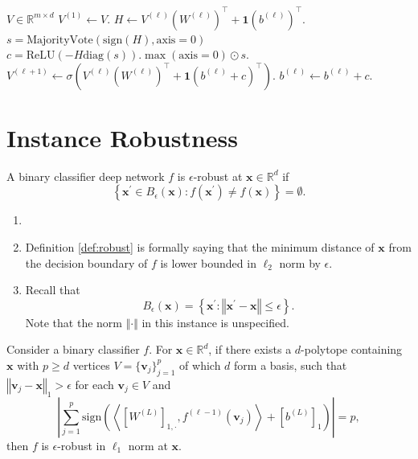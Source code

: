 \begin{algorithm}
\caption{Provably Optimal Linear Constraint Enforcement. Test time.}\label{alg:police_test_time}
\begin{algorithmic}
\Require $V\in\mathbb{R}^{m\times d}$
\State $V^{(1)}\leftarrow V$.
\State $H\leftarrow V^{(\ell)}\left(W^{(\ell)}\right)^\top+\mathbf{1}\left(b^{(\ell)}\right)^\top$.
\State $s=\text{MajorityVote}\left(\mathrm{sign}(H),\text{axis}=0\right)$
\State $c=\mathrm{ReLU}\left(-H\mathrm{diag}(s)\right).\max(\text{axis}=0)\odot s$.
\State $V^{(\ell+1)}\leftarrow\sigma\left(V^{(\ell)}\left(W^{(\ell)}\right)^\top+\mathbf{1}\left(b^{(\ell)}+c\right)^\top\right)$.
\State $b^{(\ell)}\leftarrow b^{(\ell)}+c$.
\EndFor
\end{algorithmic}
\end{algorithm}

\section{Instance Robustness}\label{sec:instance_robustness}

\begin{definition}\label{def:robust}
    A binary classifier deep network $f$ is $\epsilon$-robust at $\mathbf{x}\in\mathbb{R}^d$ if $$\left\{\mathbf{x}^\prime\in B_{\epsilon}(\mathbf{x}):f\left(\mathbf{x}^\prime\right)\neq f(\mathbf{x})\right\}=\emptyset.$$
\end{definition}

\begin{remark}
    \begin{enumerate}
        \item[]
        \item Definition \ref{def:robust} is formally saying that the minimum distance of $\mathbf{x}$ from the decision boundary of $f$ is lower bounded in $\ell_2$ norm by $\epsilon$.
        \item Recall that $$B_{\epsilon}(\mathbf{x})=\left\{\mathbf{x}^\prime:\left\Vert\mathbf{x}^\prime-\mathbf{x}\right\Vert\leq\epsilon\right\}.$$Note that the norm $\Vert\cdot\Vert$ in this instance is unspecified.
    \end{enumerate} 
\end{remark}

\begin{theorem}\label{thm:provable_instance_constraint}
    Consider a binary classifier $f$. For $\mathbf{x}\in\mathbb{R}^d$, if there exists a $d$-polytope containing $\mathbf{x}$ with $p\geq d$ vertices $V=\{\mathbf{v}_j\}_{j=1}^p$ of which $d$ form a basis, such that $\left\Vert\mathbf{v}_j-\mathbf{x}\right\Vert_1>\epsilon$ for each $\mathbf{v}_j\in V$ and 
    \begin{equation}\label{eq:condition_crop}
        \left\vert\sum_{j=1}^p\mathrm{sign}\left(\left\langle\left[W^{(L)}\right]_{1,\cdot},f^{(\ell-1)}(\mathbf{v}_j)\right\rangle+\left[b^{(L)}\right]_1\right)\right\vert=p,
    \end{equation}
    then $f$ is $\epsilon$-robust in $\ell_1$ norm at $\mathbf{x}$.
\end{theorem}

